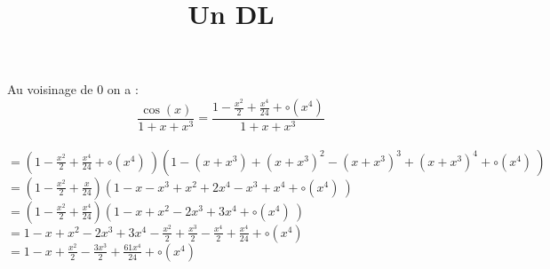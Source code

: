 \documentclass{article}
\begin{document}
\title{Un DL}
\maketitle
\renewcommand{\labelitemi}{$\circ$}



Au voisinage de $0$ on a :
$$\frac{ \cos(x) }{1+x+x^3} = \frac{1-\frac{x^2}{2} + \frac{x^4}{24} +
  \circ(x^4)}{1+x+x^3} $$ \\
$=(1-\frac{x^2}{2}+\frac{x^4}{24} +\circ(x^4) \
)(1-(x+x^3)+(x+x^3)^2-(x+x^3)^3+(x+x^3)^4 +\circ (x^4) \ ) $ \\
 $= ( 1 - \frac{x^{2}}{2} + \frac{x}{24} )(1-x-x^3+x^2+2x^4-x^3+x^4 +
\circ (x^4)
\ )$
\\
$=(1-\frac{x^2}{2}+\frac{x^4}{24})(1-x+x^2-2x^3+3x^4 +\circ (x^4) \ )$\\
$=1-x+x^2-2x^3+3x^4-\frac{x^2}{2} + \frac{x^3}{2} - \frac{x^4}{2} +
\frac{x^4}{24} + \circ(x^4)$\\
$=1-x+\frac{x^2}{2} -\frac{3x^3}{2} + \frac{61x^4}{24} + \circ(x^4)$\\





\end{document}
